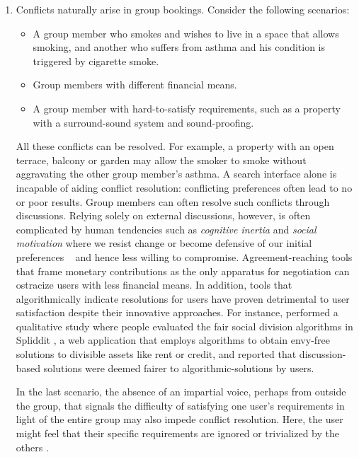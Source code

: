 \begin{enumerate}[label={}, leftmargin=0cm, itemindent=0.2cm]
    \item \cConfictsStalemates Conflicts naturally arise in group bookings. Consider the following scenarios:
    \begin{itemize}
    \item A group member who smokes and wishes to live in a space that allows smoking, and another who suffers from asthma and his condition is triggered by cigarette smoke.
    \item Group members with different financial means.
    \item A group member with hard-to-satisfy requirements, such as a property with a surround-sound system and sound-proofing.
    \end{itemize}
   All these conflicts can be resolved. For example, a property with an open terrace, balcony or garden may allow the smoker to smoke without aggravating the other group member's asthma. A search interface alone is incapable of aiding conflict resolution: conflicting preferences often lead to no or poor results. Group members can often resolve such conflicts through discussions. Relying solely on external discussions, however, is often complicated by human tendencies such as \textit{cognitive inertia} and \textit{social motivation} where we resist change or become defensive of our initial preferences ~\cite{InformationExchangeAndUseInGroupDecisionMaking} and hence less willing to compromise. Agreement-reaching tools that frame monetary contributions as the only apparatus for negotiation can ostracize users with less financial means.
   In addition, tools that algorithmically indicate resolutions for users have proven detrimental to user satisfaction despite their innovative approaches. For instance, \citeauthor{algorithmicmediation} performed a qualitative study where people evaluated the fair social division algorithms in Spliddit \cite{spliddit}, a web application that employs algorithms to obtain envy-free solutions to divisible assets like rent or credit, and reported that discussion-based solutions were deemed fairer to algorithmic-solutions by users.
   
   In the last scenario, the absence of an impartial voice, perhaps from outside the group, that signals the difficulty of satisfying one user's requirements in light of the entire group may also impede conflict resolution. Here, the user might feel that their specific requirements are ignored or trivialized by the others \cite{designingMediation, themediationprocess}.

    


\end{enumerate}

